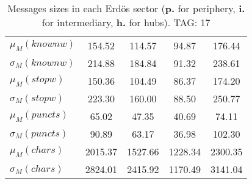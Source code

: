 \begin{table}[h!]
\begin{center}
\begin{tabular}{| l || c | c | c | c |}
$\mu_M(knownw)$ & 154.52  & 114.57  & 94.87  & 176.44 \\
$\sigma_M(knownw)$ & 214.88  & 184.84  & 91.32  & 238.61 \\\hline
$\mu_M(stopw)$ & 150.36  & 104.49  & 86.37  & 174.20 \\
$\sigma_M(stopw)$ & 223.30  & 160.00  & 88.50  & 250.77 \\\hline
$\mu_M(puncts)$ & 65.02  & 47.35  & 40.69  & 74.11 \\
$\sigma_M(puncts)$ & 90.89  & 63.17  & 36.98  & 102.30 \\\hline
$\mu_M(chars)$ & 2015.37  & 1527.66  & 1228.34  & 2300.35 \\
$\sigma_M(chars)$ & 2824.01  & 2415.92  & 1170.49  & 3141.04 \\\hline
\end{tabular}
\caption{Messages sizes in each Erd\"os sector ({{\bf p.}} for periphery, {{\bf i.}} for intermediary, {{\bf h.}} for hubs). TAG: 17}
\end{center}
\end{table}